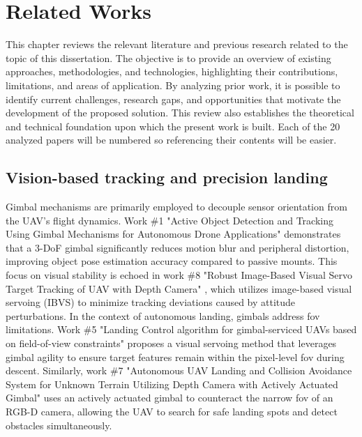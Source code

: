 
\chapter{Related Works}
\label{cap:relworks}

This chapter reviews the relevant literature and previous research related to the topic
of this dissertation. The objective is to provide an overview of existing approaches,
methodologies, and technologies, highlighting their contributions, limitations, and
areas of application. By analyzing prior work, it is possible to identify current
challenges, research gaps, and opportunities that motivate the development of the
proposed solution. This review also establishes the theoretical and technical foundation
upon which the present work is built. Each of the 20 analyzed papers will be
numbered so referencing their contents will be easier.

\section{Vision-based tracking and precision landing}

Gimbal mechanisms are primarily employed to decouple sensor orientation from the UAV's
flight dynamics. Work \#1 "Active Object Detection and Tracking Using Gimbal Mechanisms
for Autonomous Drone Applications" \cite{rel1} demonstrates that a 3-DoF gimbal
significantly reduces motion blur and peripheral distortion, improving object pose
estimation accuracy compared to passive mounts. This focus on visual stability is echoed
in work \#8 "Robust Image-Based Visual Servo Target Tracking of UAV with Depth Camera"
\cite{rel8}, which utilizes image-based visual
servoing (IBVS) to minimize tracking deviations caused by attitude perturbations.
In the context of autonomous landing, gimbals address \gls{fov} limitations.
Work \#5 "Landing Control algorithm for gimbal-serviced UAVs based on field-of-view
constraints" \cite{rel5} proposes a visual servoing method that leverages gimbal agility
to ensure target features
remain within the pixel-level \gls{fov} during descent. Similarly, work \#7 "Autonomous UAV
Landing and Collision Avoidance System for Unknown Terrain Utilizing Depth Camera with
Actively Actuated Gimbal" \cite{rel7} uses an actively actuated gimbal to counteract the
narrow \gls{fov} of an
RGB-D camera, allowing the UAV to search for safe landing spots and detect obstacles
simultaneously.

